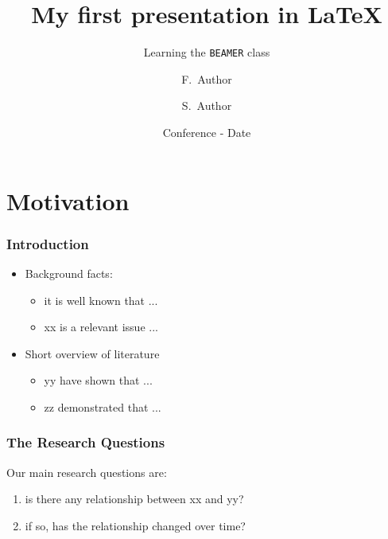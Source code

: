 \documentclass[11pt]{beamer}
\title[Short Title]{My first presentation in \LaTeX}
\subtitle{Learning the \texttt{BEAMER} class}
\author[Author1, Author2] %
{F.~Author\inst{1} \and S.~Author\inst{2}}
\institute[Universities XX and YY] %
{
	\inst{1}%
	Department of Public Health \\
	University XX
	\and
	\inst{2}%
	Department of Social Sciences\\
	University YY}
\date[] %
{Conference - Date}
\begin{document}
\begin{frame}  %
\titlepage
\end{frame}	

	

\section{Motivation}   %

\begin{frame}          %
\frametitle{Introduction}
\begin{itemize}
	\item 
	Background facts:
		\begin{itemize}
		\item it is well known that ...
		\item xx is a relevant issue ...
		\end{itemize}
	\bigskip
	\item
	Short overview of literature
	\begin{itemize}
		\item yy have shown that ...
		\item zz demonstrated that ...
	\end{itemize}
\end{itemize}
\end{frame}

\begin{frame}          %
\frametitle{The Research Questions}
Our main research questions are:
\bigskip
	\begin{enumerate}
	\item is there any relationship between xx and yy?
	\bigskip
	\item if so, has the relationship changed over time? 
	\end{enumerate}
\end{frame}

\end{document}

